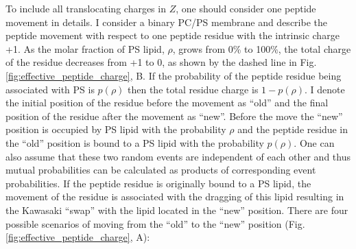 To include all translocating charges in $Z$, one should consider one peptide movement in details. I consider a binary PC/PS membrane and describe the peptide movement with respect to one peptide residue with the intrinsic charge +1. As the molar fraction of PS lipid, $\rho$, grows from 0\% to 100\%, the total charge of the residue decreases from +1 to 0, as shown by the dashed line in Fig. \ref{fig:effective_peptide_charge}, B. If the probability of the peptide residue being associated with PS is $p(\rho)$ then the total residue charge is $1-p(\rho)$. I denote the initial position of the residue before the movement as ``old'' and the final position of the residue after the movement as ``new''. Before the move the ``new'' position is occupied by PS lipid with the probability $\rho$ and the peptide residue in the ``old'' position is bound to a PS lipid with the probability $p(\rho)$. One can also assume that these two random events are independent of each other and thus mutual probabilities can be calculated as products of corresponding event probabilities. If the peptide residue is originally bound to a PS lipid, the movement of the residue is associated with the dragging of this lipid resulting in the Kawasaki ``swap'' with the lipid located in the ``new'' position. There are four possible scenarios of moving from the ``old'' to the ``new'' position (Fig. \ref{fig:effective_peptide_charge}, A):
